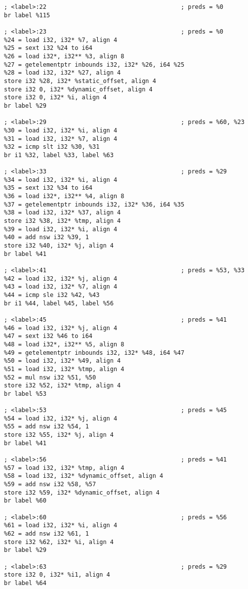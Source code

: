\begin{verbatim}
; <label>:22                                      ; preds = %0
br label %115

; <label>:23                                      ; preds = %0
%24 = load i32, i32* %7, align 4
%25 = sext i32 %24 to i64
%26 = load i32*, i32** %3, align 8
%27 = getelementptr inbounds i32, i32* %26, i64 %25
%28 = load i32, i32* %27, align 4
store i32 %28, i32* %static_offset, align 4
store i32 0, i32* %dynamic_offset, align 4
store i32 0, i32* %i, align 4
br label %29

; <label>:29                                      ; preds = %60, %23
%30 = load i32, i32* %i, align 4
%31 = load i32, i32* %7, align 4
%32 = icmp slt i32 %30, %31
br i1 %32, label %33, label %63

; <label>:33                                      ; preds = %29
%34 = load i32, i32* %i, align 4
%35 = sext i32 %34 to i64
%36 = load i32*, i32** %4, align 8
%37 = getelementptr inbounds i32, i32* %36, i64 %35
%38 = load i32, i32* %37, align 4
store i32 %38, i32* %tmp, align 4
%39 = load i32, i32* %i, align 4
%40 = add nsw i32 %39, 1
store i32 %40, i32* %j, align 4
br label %41

; <label>:41                                      ; preds = %53, %33
%42 = load i32, i32* %j, align 4
%43 = load i32, i32* %7, align 4
%44 = icmp sle i32 %42, %43
br i1 %44, label %45, label %56

; <label>:45                                      ; preds = %41
%46 = load i32, i32* %j, align 4
%47 = sext i32 %46 to i64
%48 = load i32*, i32** %5, align 8
%49 = getelementptr inbounds i32, i32* %48, i64 %47
%50 = load i32, i32* %49, align 4
%51 = load i32, i32* %tmp, align 4
%52 = mul nsw i32 %51, %50
store i32 %52, i32* %tmp, align 4
br label %53

; <label>:53                                      ; preds = %45
%54 = load i32, i32* %j, align 4
%55 = add nsw i32 %54, 1
store i32 %55, i32* %j, align 4
br label %41

; <label>:56                                      ; preds = %41
%57 = load i32, i32* %tmp, align 4
%58 = load i32, i32* %dynamic_offset, align 4
%59 = add nsw i32 %58, %57
store i32 %59, i32* %dynamic_offset, align 4
br label %60

; <label>:60                                      ; preds = %56
%61 = load i32, i32* %i, align 4
%62 = add nsw i32 %61, 1
store i32 %62, i32* %i, align 4
br label %29

; <label>:63                                      ; preds = %29
store i32 0, i32* %i1, align 4
br label %64


\end{verbatim}
